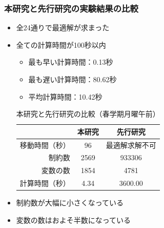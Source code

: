 \documentclass[dvipdfmx,12pt]{beamer}
\begin{document}
\begin{frame}\frametitle{本研究と先行研究の実験結果の比較}
\begin{itemize}

\item 全24通りで最適解が求まった
\item 全ての計算時間が100秒以内
\begin{itemize}
\item 最も早い計算時間：0.13秒
\item 最も遅い計算時間：80.62秒
\item 平均計算時間：10.42秒
\end{itemize}

\begin{table}[h]
\begin{center}
\caption{本研究と先行研究の比較（春学期月曜午前）}
\vspace{-5pt}
\begin{tabular}{r|cc}
\hline
&本研究&先行研究 \\
\hline
移動時間（秒）& 96  & 最適解求解不可  \\  
制約数& 2569 &  933306 \\ 
変数の数&1854 & 4781 \\
計算時間（秒） &4.34&  3600.00\\
\hline
\end{tabular}
\end{center}
\end{table}
\item 制約数が大幅に小さくなっている
\item 変数の数はおよそ半数になっている
\end{itemize}
\end{frame}
\end{document}
